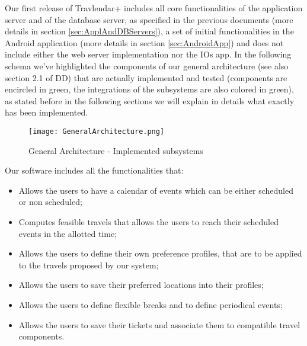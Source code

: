 Our first release of Travlendar+ includes all core functionalities of the application server and of the database server, as specified in the previous documents (more details in section \ref{sec:ApplAndDBServers}), a set of initial functionalities in the Android application (more details in section \ref{sec:AndroidApp}) and does not include either the web server implementation nor the IOs app.
In the following schema we've highlighted the components of our general architecture (see also section 2.1 of DD) that are actually implemented and tested (components are encircled in green, the integrations of the subsystems are also colored in green), as stated before in the following sections we will explain in details what exactly has been implemented.
\begin{figure}[H]
	\begin{center}
		\hspace*{-40pt}
		\texttt{[image: GeneralArchitecture.png]}
	\end{center}
\caption{General Architecture - Implemented subsystems}
\end{figure}

\newpage

Our software includes all the functionalities that:
\begin{itemize}
	\item Allows the users to have a calendar of events which can be either scheduled or non scheduled;
	\item Computes feasible travels that allows the users to reach their scheduled events in the allotted time;
	\item Allows the users to define their own preference profiles, that are to be applied to the travels proposed by our system;
	\item Allows the users to save their preferred locations into their profiles;
	\item Allows the users to define flexible breaks and to define periodical events;
	\item Allows the users to save their tickets and associate them to compatible travel components.
\end{itemize}

